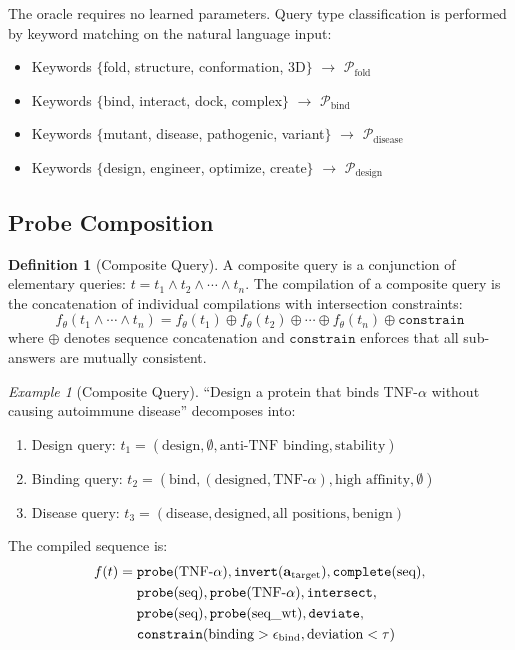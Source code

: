 \documentclass[11pt,twocolumn,a4paper]{article}
\theoremstyle{definition}
\newtheorem{definition}[theorem]{Definition}
\theoremstyle{remark}
\newtheorem{example}[theorem]{Example}
\newcommand{\params}{\theta}
\newcommand{\addr}{\mathbf{a}}
\newcommand{\probe}{\mathcal{P}}
\begin{document}
The oracle requires no learned parameters. Query type classification is performed by keyword matching on the natural language input:
\begin{itemize}
    \item Keywords $\{$fold, structure, conformation, 3D$\}$ $\to$ $\probe_{\text{fold}}$
    \item Keywords $\{$bind, interact, dock, complex$\}$ $\to$ $\probe_{\text{bind}}$
    \item Keywords $\{$mutant, disease, pathogenic, variant$\}$ $\to$ $\probe_{\text{disease}}$
    \item Keywords $\{$design, engineer, optimize, create$\}$ $\to$ $\probe_{\text{design}}$
\end{itemize}

\subsection{Probe Composition}

\begin{definition}[Composite Query]
\label{def:composite_query}
A composite query is a conjunction of elementary queries: $t = t_1 \wedge t_2 \wedge \cdots \wedge t_n$. The compilation of a composite query is the concatenation of individual compilations with intersection constraints:
\begin{equation}
f_\params(t_1 \wedge \cdots \wedge t_n) = f_\params(t_1) \oplus f_\params(t_2) \oplus \cdots \oplus f_\params(t_n) \oplus \texttt{constrain}
\end{equation}
where $\oplus$ denotes sequence concatenation and $\texttt{constrain}$ enforces that all sub-answers are mutually consistent.
\end{definition}

\begin{example}[Composite Query]
``Design a protein that binds TNF-$\alpha$ without causing autoimmune disease'' decomposes into:
\begin{enumerate}
    \item Design query: $t_1 = (\text{design}, \emptyset, \text{anti-TNF binding}, \text{stability})$
    \item Binding query: $t_2 = (\text{bind}, (\text{designed}, \text{TNF-}\alpha), \text{high affinity}, \emptyset)$
    \item Disease query: $t_3 = (\text{disease}, \text{designed}, \text{all positions}, \text{benign})$
\end{enumerate}
The compiled sequence is:
\begin{align}
f(t) = \; &\texttt{probe}(\text{TNF-}\alpha), \texttt{invert}(\addr_{\text{target}}), \texttt{complete}(\text{seq}), \notag \\
&\texttt{probe}(\text{seq}), \texttt{probe}(\text{TNF-}\alpha), \texttt{intersect}, \notag \\
&\texttt{probe}(\text{seq}), \texttt{probe}(\text{seq\_wt}), \texttt{deviate}, \notag \\
&\texttt{constrain}(\text{binding} > \epsilon_{\text{bind}}, \text{deviation} < \tau)
\end{align}
\end{example}
\end{document}
